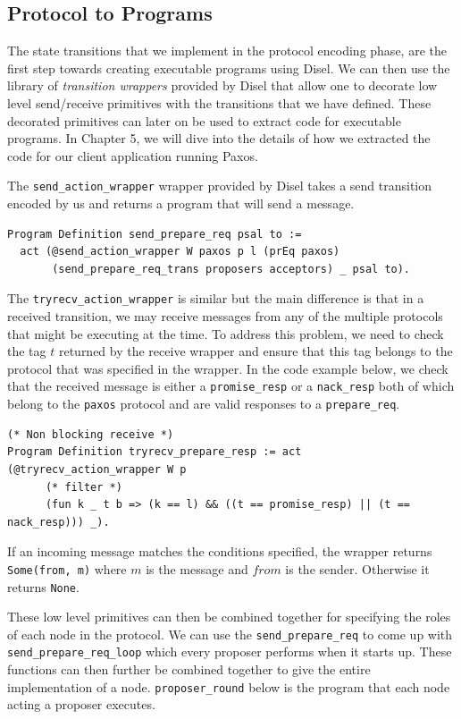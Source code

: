 \subsection{Protocol to Programs}
The state transitions that we implement in the protocol encoding phase, are the
first step towards creating executable programs using Disel.
We can then use the library of \textit{transition wrappers} provided by Disel
that allow one to decorate low level send/receive primitives with the transitions
that we have defined. These decorated primitives can later on be used to extract
code for executable programs. In Chapter 5, we will dive into the details of
how we extracted the code for our client application running Paxos.

The \texttt{send\_action\_wrapper} wrapper provided by Disel takes a send transition encoded
by us and returns a program that will send a message.
\begin{lstlisting}
Program Definition send_prepare_req psal to :=
  act (@send_action_wrapper W paxos p l (prEq paxos)
       (send_prepare_req_trans proposers acceptors) _ psal to).
\end{lstlisting}

The \texttt{tryrecv\_action\_wrapper} is similar but the main difference is that in
a received transition, we may receive messages from any of the multiple protocols
that might be executing at the time. To address this problem, we need to check the
tag $t$ returned by the receive wrapper and ensure that this tag belongs to the
protocol that was specified in the wrapper. In the code example below, we check
that the received message is either a \texttt{promise\_resp} or a \texttt{nack\_resp}
both of which belong to the \texttt{paxos} protocol and are valid responses to a
\texttt{prepare\_req}.

\begin{lstlisting}
(* Non blocking receive *)
Program Definition tryrecv_prepare_resp := act (@tryrecv_action_wrapper W p
      (* filter *)
      (fun k _ t b => (k == l) && ((t == promise_resp) || (t == nack_resp))) _).
\end{lstlisting}

If an incoming message matches the conditions specified, the wrapper returns
\texttt{Some(from, m)} where $m$ is the message and $from$ is the sender. Otherwise
it returns \texttt{None}.

These low level primitives can then be combined together for specifying the roles
of each node in the protocol. We can use the \texttt{send\_prepare\_req} to
come up with \texttt{send\_prepare\_req\_loop} which every proposer performs when
it starts up. These functions can then further be combined together to give the
entire implementation of a node. \texttt{proposer\_round} below is the program
that each node acting a proposer executes.

